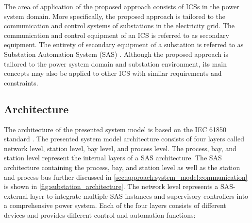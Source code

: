 The area of application of the proposed approach consists of ICSs in the power system domain.
More specifically, the proposed approach is tailored to the communication and control systems of substations in the electricity grid.
The communication and control equipment of an ICS is referred to as secondary equipment.
The entirety of secondary equipment of a substation is referred to as Substation Automation System (SAS) \cite{Padilla2015}.
Although the proposed approach is tailored to the power system domain and substation environment, its main concepts may also be applied to other ICS with similar requirements and constraints.

\subsection{Architecture}
The architecture of the presented system model is based on the IEC 61850 standard \cite{IEC61850P5}.
The presented system model architecture consists of four layers called network level, station level, bay level, and process level.
The process, bay, and station level represent the internal layers of a SAS architecture.
The SAS architecture containing the process, bay, and station level as well as the station and process bus further discussed in \autoref{sec:approach:system_model:communication} is shown in \autoref{fig:substation_architecture}.
The network level represents a SAS-external layer to integrate multiple SAS instances and supervisory controllers into a comprehensive power system.
Each of the four layers consists of different devices and provides different control and automation functions:
